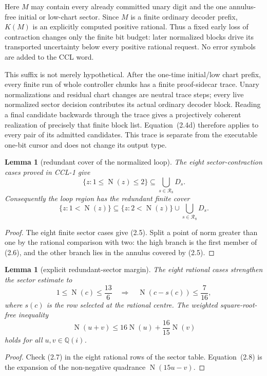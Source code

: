 \documentclass[10pt]{article}
\newtheorem{lemma}[theorem]{Lemma}
\theoremstyle{definition}
\theoremstyle{remark}
\newcommand{\Qi}{\mathbb{Q}(i)}
\newcommand{\Norm}{\operatorname{N}}
\begin{document}
Here $M$ may contain every already committed unary digit and the one
annulus-free initial or low-chart sector.  Since $M$ is a finite ordinary
decoder prefix, $K(M)$ is an explicitly computed positive rational.  Thus a
fixed early loss of contraction changes only the finite bit budget: later
normalized blocks drive its transported uncertainty below every positive
rational request.  No error symbols are added to the CCL word.

This suffix is not merely hypothetical.  After the one-time initial/low chart
prefix, every finite run of whole controller chunks has a finite proof-sidecar
trace.  Unary normalizations and residual chart changes are neutral trace
steps; every live normalized sector decision contributes its actual ordinary
decoder block.  Reading a final candidate backwards through the trace gives a
projectively coherent realization of precisely that finite block list.
Equation~(2.4d) therefore applies to every pair of its admitted candidates.
This trace is separate from the executable one-bit cursor and does not change
its output type.

\begin{lemma}[redundant cover of the normalized loop]
The eight sector-contraction cases proved in CCL-1 give
\[
 \{z:1\le\Norm(z)\le2\}\subseteq\bigcup_{s\in\mathcal R_8}D_s.
\tag{2.5}
\]
Consequently the loop region has the redundant finite cover
\[
 \{z:1<\Norm(z)\}
 \subseteq
 \{z:2<\Norm(z)\}\cup\bigcup_{s\in\mathcal R_8}D_s.
\tag{2.6}
\]
\end{lemma}

\begin{proof}
The eight finite sector cases give (2.5).  Split a point of norm greater than
one by the rational comparison with two: the high branch is the first member
of (2.6), and the other branch lies in the annulus covered by (2.5).
\end{proof}

\begin{lemma}[explicit redundant-sector margin]
The eight rational cases strengthen the sector estimate to
\[
 1\le\Norm(c)\le\frac{13}{6}
 \quad\Longrightarrow\quad
 \Norm(c-s(c))\le\frac7{16},
\tag{2.7}
\]
where $s(c)$ is the row selected at the rational centre.  The weighted square-root-free inequality
\[
 \Norm(u+v)\le16\Norm(u)+\frac{16}{15}\Norm(v)
\tag{2.8}
\]
holds for all $u,v\in\Qi$.
\end{lemma}

\begin{proof}
Check (2.7) in the eight rational rows of the sector table.  Equation~(2.8)
is the expansion of the non-negative quadrance $\Norm(15u-v)$.
\end{proof}
\end{document}
